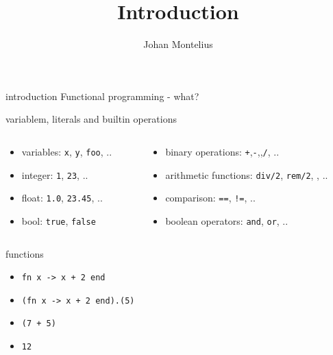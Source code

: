 


\title[ID1019 Introduction]{Introduction}

\author{Johan Montelius}
\date{\semester}



\begin{frame}
\titlepage
\end{frame}

\begin{frame}{introduction}
  Functional programming - what?
\end{frame}

\begin{frame}{variablem, literals and builtin operations}
\begin{columns}
 \begin{column}{0.4\linewidth}
   \begin{itemize}
     \pause \item {variables:} {\tt x}, {\tt y}, {\tt foo}, ..
     \pause \item {integer:} {\tt 1}, {\tt 23}, ..
     \pause \item {float:} {\tt 1.0}, {\tt 23.45}, ..
     \pause \item {bool:} {\tt true}, {\tt false} 
   \end{itemize}
 \end{column}
 \begin{column}{0.6\linewidth}
  \begin{itemize}
    \pause \item {binary operations:} {\tt +},{\tt -},{\tt *},{\tt /}, ..
    \pause \item {arithmetic functions:} {\tt div/2}, {\tt rem/2}, {\tt *}, ..   
    \pause \item {comparison:} {\tt ==}, {\tt !=}, ..
    \pause \item {boolean operators:} {\tt and}, {\tt or}, ..
  \end{itemize}
 \end{column}
\end{columns}

\vspace{20pt}{\em There are more but this is fine for now.}

\end{frame}


\begin{frame}{functions}
  \begin{itemize}
   \pause \item {\tt fn x -> x + 2 end}
   \pause \item {\tt (fn x -> x + 2 end).(5)}
   \pause \item {\tt (7 + 5)}
   \pause \item {\tt 12}
  \end{itemize}


\vspace{20pt}{\em Can we give names to functions?}  
\end{frame}


